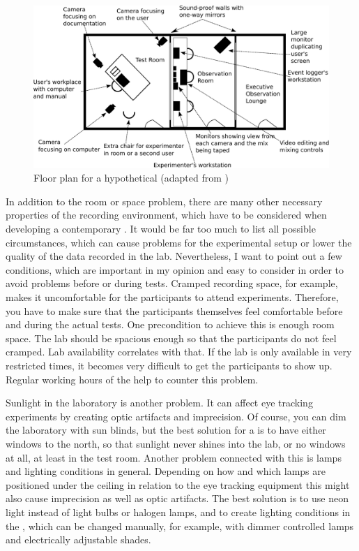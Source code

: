 \documentclass[output=paper]{langsci/langscibook}
\begin{document}
\begin{figure}
 \includegraphics[width=\textwidth]{figures/Roesener6.pdf}
 \caption{Floor plan for a hypothetical  (adapted from \citealt[201]{nielsen1993})} 
 \label{roesener:fig:6}
\end{figure} 


In addition to the room or space problem, there are many other necessary properties of the recording environment, which have to be considered when developing a contemporary . It would be far too much to list all possible circumstances, which can cause problems for the experimental setup or lower the quality of the data recorded in the  lab. Nevertheless, I want to point out a few conditions, which are important in my opinion and easy to consider in order to avoid problems before or during  tests. Cramped recording space, for example, makes it uncomfortable for the participants to attend  experiments. Therefore, you have to make sure that the participants themselves feel comfortable before and during the actual  tests. One precondition to achieve this is enough room space. The lab should be spacious enough so that the participants do not feel cramped. Lab availability correlates with that. If the lab is only available in very restricted times, it becomes very difficult to get the participants to show up. Regular working hours of the  help to counter this problem.


 Sunlight in the laboratory is another problem. It can affect eye tracking experiments by creating optic artifacts and imprecision. Of course, you can dim the laboratory with sun blinds, but the best solution for a  is to have either windows to the north, so that sunlight never shines into the lab, or no windows at all, at least in the test room. Another problem connected with this is lamps and lighting conditions in general. Depending on how and which lamps are positioned under the ceiling in relation to the eye tracking equipment this might also cause imprecision as well as optic artifacts. The best solution is to use neon light instead of light bulbs or halogen lamps, and to create lighting conditions in the , which can be changed manually, for example, with dimmer controlled lamps and electrically adjustable shades.
\end{document}
